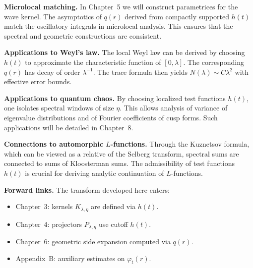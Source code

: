 \medskip

\noindent\textbf{Microlocal matching.}
In Chapter~5 we will construct parametrices for the wave kernel.
The asymptotics of $q(r)$ derived from compactly supported $h(t)$
match the oscillatory integrals in microlocal analysis.
This ensures that the spectral and geometric constructions are consistent.

\medskip

\noindent\textbf{Applications to Weyl’s law.}
The local Weyl law can be derived by choosing $h(t)$
to approximate the characteristic function of $[0,\lambda]$.
The corresponding $q(r)$ has decay of order $\lambda^{-1}$.
The trace formula then yields $N(\lambda)\sim C\lambda^{2}$ with effective error bounds.

\medskip

\noindent\textbf{Applications to quantum chaos.}
By choosing localized test functions $h(t)$,
one isolates spectral windows of size $\eta$.
This allows analysis of variance of eigenvalue distributions
and of Fourier coefficients of cusp forms.
Such applications will be detailed in Chapter~8.

\medskip

\noindent\textbf{Connections to automorphic $L$-functions.}
Through the Kuznetsov formula,
which can be viewed as a relative of the Selberg transform,
spectral sums are connected to sums of Kloosterman sums.
The admissibility of test functions $h(t)$ is crucial
for deriving analytic continuation of $L$-functions.

\medskip

\noindent\textbf{Forward links.}
The transform developed here enters:
\begin{itemize}
  \item Chapter~3: kernels $K_{\lambda,\eta}$ are defined via $h(t)$.
  \item Chapter~4: projectors $P_{\lambda,\eta}$ use cutoff $h(t)$.
  \item Chapter~6: geometric side expansion computed via $q(r)$.
  \item Appendix~B: auxiliary estimates on $\varphi_{t}(r)$.
\end{itemize}

\medskip

